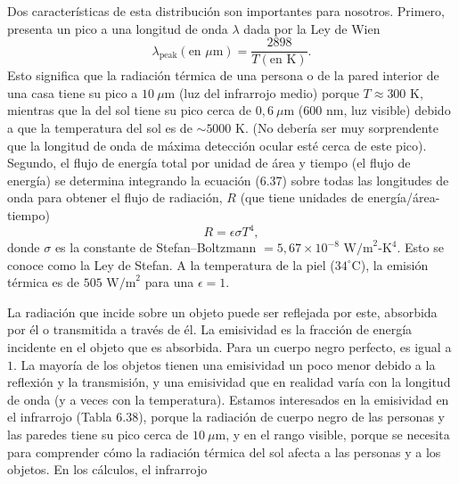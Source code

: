 \documentclass[12pt]{book}
\begin{document}
Dos características de esta distribución son importantes para nosotros. Primero, presenta un pico a una longitud de onda $\lambda$ dada por la Ley de Wien
\begin{equation}
\lambda_{\text{peak}} (\text{en }\mu\text{m}) = \frac{2898}{T (\text{en K})}.
\label{eq:638}
\end{equation}
Esto significa que la radiación térmica de una persona o de la pared interior de una casa tiene su pico a $10\ \mu\text{m}$ (luz del infrarrojo medio) porque $T \approx 300\text{ K}$, mientras que la del sol tiene su pico cerca de $0{,}6\ \mu\text{m}$ ($600\text{ nm}$, luz visible) debido a que la temperatura del sol es de $\sim 5000\text{ K}$. (No debería ser muy sorprendente que la longitud de onda de máxima detección ocular esté cerca de este pico). Segundo, el flujo de energía total por unidad de área y tiempo (el flujo de energía) se determina integrando la ecuación (6.37) sobre todas las longitudes de onda para obtener el flujo de radiación, $R$ (que tiene unidades de energía/área-tiempo)
\begin{equation}
R = \epsilon \sigma T^4,
\label{eq:639}
\end{equation}
donde $\sigma$ es la constante de Stefan--Boltzmann $= 5{,}67 \times 10^{-8}\text{ W/m}^2\text{-K}^4$. Esto se conoce como la Ley de Stefan. A la temperatura de la piel ($34^\circ\text{C}$), la emisión térmica es de $505\text{ W/m}^2$ para una $\epsilon = 1$.

La radiación que incide sobre un objeto puede ser reflejada por este, absorbida por él o transmitida a través de él. La emisividad es la fracción de energía incidente en el objeto que es absorbida. Para un cuerpo negro perfecto, es igual a $1$. La mayoría de los objetos tienen una emisividad un poco menor debido a la reflexión y la transmisión, y una emisividad que en realidad varía con la longitud de onda (y a veces con la temperatura). Estamos interesados en la emisividad en el infrarrojo (Tabla 6.38), porque la radiación de cuerpo negro de las personas y las paredes tiene su pico cerca de $10\ \mu\text{m}$, y en el rango visible, porque se necesita para comprender cómo la radiación térmica del sol afecta a las personas y a los objetos. En los cálculos, el infrarrojo
\end{document}
